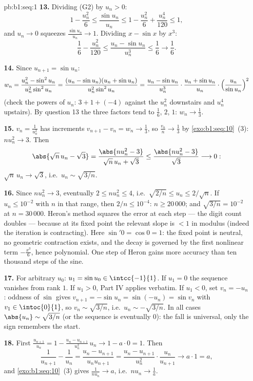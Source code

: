 \begin{solution}{pb:b1:seq:1}
\textbf{13.} Dividing (G2) by $u_n > 0$:
\[
1 - \frac{u_n^2}{6} \leq \frac{\sin u_n}{u_n} \leq 1 -
\frac{u_n^2}{6} + \frac{u_n^4}{120} \leq 1 ,
\]
and $u_n \to 0$ squeezes $\frac{\sin u_n}{u_n} \to 1$. Dividing
$x - \sin x$ by $x^3$:
\[
\frac16 - \frac{u_n^2}{120} \leq \frac{u_n - \sin u_n}{u_n^3}
\leq \frac16 \longrightarrow \frac16 .
\]

\textbf{14.} Since $u_{n+1} = \sin u_n$:
\[
w_n = \frac{u_n^2 - \sin^2 u_n}{u_n^2 \sin^2 u_n}
= \frac{(u_n - \sin u_n)(u_n + \sin u_n)}{u_n^2 \sin^2 u_n}
= \frac{u_n - \sin u_n}{u_n^3}\cdot
\frac{u_n + \sin u_n}{u_n}\cdot
\Bigl(\frac{u_n}{\sin u_n}\Bigr)^{2}
\]
(check the powers of $u_n$: $3 + 1 + (-4)$ against the $u_n^2$
downstairs and $u_n^4$ upstairs). By question 13 the three
factors tend to $\frac16$, $2$, $1$: $w_n \to \frac13$.

\textbf{15.} $v_n = \frac{1}{u_n^2}$ has increments $v_{n+1} -
v_n = w_n \to \frac13$, so $\frac{v_n}{n} \to \frac13$ by
\cref{exo:b1:seq:10}~(3): $n u_n^2 \to 3$. Then
\[
\abs{\sqrt n\,u_n - \sqrt 3}
= \frac{\abs{n u_n^2 - 3}}{\sqrt n\,u_n + \sqrt 3}
\leq \frac{\abs{n u_n^2 - 3}}{\sqrt 3} \longrightarrow 0 :
\]
$\sqrt n\,u_n \to \sqrt 3$, i.e.\ $u_n \sim \sqrt{3/n}$.

\textbf{16.} Since $n u_n^2 \to 3$, eventually $2 \leq n u_n^2
\leq 4$, i.e.\ $\sqrt{2/n} \leq u_n \leq 2/\sqrt n$. If $u_n
\leq 10^{-2}$ with $n$ in that range, then $2/n \leq 10^{-4}$:
$n \geq 20\,000$; and $\sqrt{3/n} = 10^{-2}$ at $n = 30\,000$.
Heron's method squares the error at each step --- the digit
count doubles --- because at its fixed point the relevant slope
is $< 1$ in modulus (indeed the iteration is contracting).
Here $\sin' 0 = \cos 0 = 1$: the fixed point is neutral, no
geometric contraction exists, and the decay is governed by the
first nonlinear term $-\frac{x^3}{6}$, hence polynomial. One
step of Heron gains more accuracy than ten thousand steps of
the sine.

\textbf{17.} For arbitrary $u_0$: $u_1 = \sin u_0 \in
\intcc{-1}{1}$. If $u_1 = 0$ the sequence vanishes from rank
$1$. If $u_1 > 0$, Part IV applies verbatim. If $u_1 < 0$, set
$v_n = -u_n$: oddness of $\sin$ gives $v_{n+1} = -\sin u_n =
\sin(-u_n) = \sin v_n$ with $v_1 \in \intoc{0}{1}$, so $v_n \sim
\sqrt{3/n}$, i.e.\ $u_n \sim -\sqrt{3/n}$. In all cases
$\abs{u_n} \sim \sqrt{3/n}$ (or the sequence is eventually $0$):
the fall is universal, only the sign remembers the start.

\textbf{18.} First $\frac{u_{n+1}}{u_n} = 1 - \frac{u_n -
u_{n+1}}{u_n^2}\,u_n \to 1 - a \cdot 0 = 1$. Then
\[
\frac{1}{u_{n+1}} - \frac{1}{u_n}
= \frac{u_n - u_{n+1}}{u_n u_{n+1}}
= \frac{u_n - u_{n+1}}{u_n^2}\cdot\frac{u_n}{u_{n+1}}
\longrightarrow a \cdot 1 = a ,
\]
and \cref{exo:b1:seq:10}~(3) gives $\frac{1}{n u_n} \to a$,
i.e.\ $n u_n \to \frac1a$.


\end{solution}
